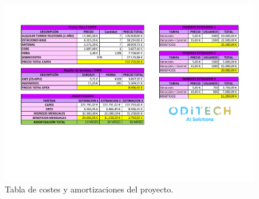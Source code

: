\begin{figure}[H]
    \centering
    \includegraphics[width=0.99\textwidth]{Imagenes/Costes/costes.pdf}
    \caption{Tabla de costes y amortizaciones del proyecto.}
    \label{fig:Costes}
\end{figure}
